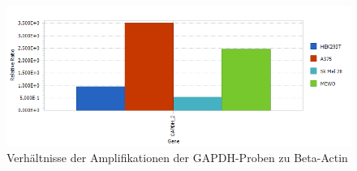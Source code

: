 \documentclass{article}
\begin{document}
\begin{figure}[H]
    \centering
    \includegraphics[width=\textwidth]{images/cycler/G1_2_G2.png}
    \caption{Verhältnisse der Amplifikationen der GAPDH-Proben zu Beta-Actin}
    \label{fig:gapdh2beta}
\end{figure}
\end{document}
